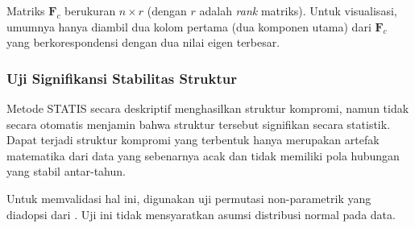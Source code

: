 \documentclass[a4paper]{article}
\theoremstyle{definition} %
\begin{document}
Matriks $\mathbf{F}_c$ berukuran $n \times r$ (dengan $r$ adalah \textit{rank} matriks). Untuk visualisasi, umumnya hanya diambil dua kolom pertama (dua komponen utama) dari $\mathbf{F}_c$ yang berkorespondensi dengan dua nilai eigen terbesar.

\subsubsection{Uji Signifikansi Stabilitas Struktur}

Metode STATIS secara deskriptif menghasilkan struktur kompromi, namun tidak secara otomatis menjamin bahwa struktur tersebut signifikan secara statistik. Dapat terjadi struktur kompromi yang terbentuk hanya merupakan artefak matematika dari data yang sebenarnya acak dan tidak memiliki pola hubungan yang stabil antar-tahun.

Untuk memvalidasi hal ini, digunakan uji permutasi non-parametrik yang diadopsi dari \cite{kazi1995}. Uji ini tidak mensyaratkan asumsi distribusi normal pada data.
\end{document}
